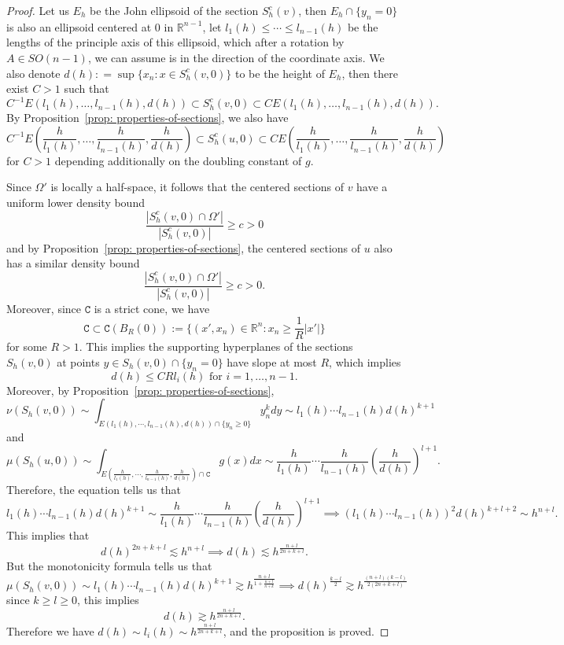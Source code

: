 \documentclass[12pt,reqno]{amsart}
\numberwithin{equation}{section}
\begin{document}
    \begin{proof}
        Let us $E_h$ be the John ellipsoid of the section $S^c_h(v)$, then $E_h\cap\{y_n = 0\}$ is also an ellipsoid centered at $0$ in $\mathbb R^{n-1}$, let $l_1(h)\leq \cdots\leq l_{n-1}(h)$ be the lengths of the principle axis of this ellipsoid, which after a rotation by $A\in SO(n-1)$, we can assume is in the direction of the coordinate axis. We also denote $d(h): = \sup\{x_n: x\in S_h^c(v, 0)\}$ to be the height of $E_h$, then there exist $C>1$ such that
        \[C^{-1}E(l_1(h), \ldots, l_{n-1}(h), d(h))\subset S_h^c(v, 0)\subset CE(l_1(h), \ldots, l_{n-1}(h), d(h)). \]
        By Proposition~\ref{prop: properties-of-sections}, we also have
        \[C^{-1}E\left(\frac{h}{l_1(h)}, \ldots, \frac{h}{l_{n-1}(h)}, \frac{h}{d(h)}\right)\subset S_h^c(u, 0)\subset CE\left(\frac{h}{l_1(h)}, \ldots, \frac{h}{l_{n-1}(h)}, \frac{h}{d(h)}\right)\]
        for $C>1$ depending additionally on the doubling constant of $g$. 
        
        Since $\Omega'$ is locally a half-space, it follows that the centered sections of $v$ have a uniform lower density bound
        \[\frac{|S_h^c(v, 0)\cap\Omega'|}{|S_h^c(v, 0)|}\geq c>0\]
        and by Proposition~\ref{prop: properties-of-sections}, the centered sections of $u$ also has a similar density bound
        \[\frac{|S_h^c(v, 0)\cap\Omega'|}{|S_h^c(v, 0)|}\geq c>0.\]
        Moreover, since $\mathtt C$ is a strict cone, we have 
        \[\mathtt C\subset \mathtt C(B_R(0)) := \{(x', x_n)\in \mathbb R^n: x_n\geq \frac 1 R|x'|\}\]
        for some $R>1$. This implies the supporting hyperplanes of the sections $S_h(v, 0)$ at points $y\in S_h(v, 0)\cap\{y_n = 0\}$ have slope at most $R$, which implies
        \[d(h)\leq  CR l_i(h) \text{ for }i = 1, \ldots, n-1. \]
        Moreover, by Proposition~\ref{prop: properties-of-sections}, 
        \[\nu(S_h(v, 0))\sim \int_{E(l_1(h), \cdots, l_{n-1}(h), d(h))\cap\{y_n\geq 0\}}y_n^kdy\sim l_1(h)\cdots l_{n-1}(h)d(h)^{k+1}\]
        and 
        \[\mu(S_h(u, 0))\sim \int_{E(\frac{h}{l_1(h)}, \cdots, \frac{h}{l_{n-1}(h)}, \frac{h}{d(h)})\cap \mathtt C}g(x)dx\sim \frac{h}{l_1(h)}\cdots \frac{h}{l_{n-1}(h)}(\frac{h}{d(h)})^{l+1}. \]
        Therefore, the equation tells us that
        \[l_1(h)\cdots l_{n-1}(h)d(h)^{k+1}\sim\frac{h}{l_1(h)}\cdots \frac{h}{l_{n-1}(h)}(\frac{h}{d(h)})^{l+1} \implies (l_1(h)\cdots l_{n-1}(h))^2d(h)^{k+l+2}\sim h^{n+l}. \]
        This implies that 
        \[d(h)^{2n+k+l}\lesssim h^{n+l} \implies d(h)\lesssim h^{\frac{n+l}{2n+k+l}}. \]
        But the monotonicity formula tells us that 
        \[\mu(S_h(v, 0)) \sim l_1(h)\cdots l_{n-1}(h)d(h)^{k+1}\gtrsim h^{\frac{n+l}{1+\frac{n+l}{n+k}}}\implies d(h)^{\frac{k-l}{2}}\gtrsim h^{\frac{(n+l)(k-l)}{2(2n+k+l)}}\]
        since $k\geq l\geq 0$, this implies
        \[d(h)\gtrsim h^{\frac{n+l}{2n+k+l}}. \]
        Therefore we have $d(h)\sim l_i(h)\sim h^{\frac{n+l}{2n+k+l}}$, and the proposition is proved. 
\end{proof}
\end{document}
